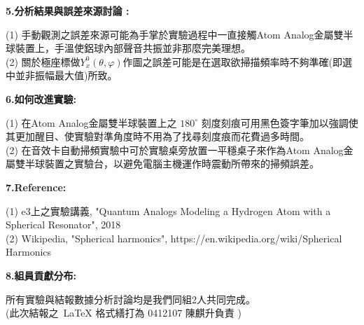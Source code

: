 \documentclass[UTF8]{ctexart}
\begin{document}
\begin{CJK*}{UTF8}{song}


\begin{large}
\textbf{5.分析結果與誤差來源討論 :} \\
\end{large}
(1) 手動觀測之誤差來源可能為手掌於實驗過程中一直接觸Atom Analog金屬雙半球裝置上，手溫使鋁球內部聲音共振並非那麼完美理想。 \\
(2) 關於極座標做$Y^{0}_{x}(\theta,\varphi)$作圖之誤差可能是在選取欲掃描頻率時不夠準確(即選中並非振幅最大值)所致。\\

\begin{large}
\textbf{6.如何改進實驗: } \\
\end{large}
(1) 在Atom Analog金屬雙半球裝置上之 $180^{\circ}$ 刻度刻痕可用黑色簽字筆加以強調使其更加醒目、使實驗對準角度時不用為了找尋刻度痕而花費過多時間。  \\
(2) 在音效卡自動掃頻實驗中可於實驗桌旁放置一平穩桌子來作為Atom Analog金屬雙半球裝置之實驗台，以避免電腦主機運作時震動所帶來的掃頻誤差。  \\

\begin{large}
\textbf{7.Reference: } \\
\end{large}
(1) e3上之實驗講義, "Quantum Analogs Modeling a Hydrogen Atom with a Spherical Resonator", 2018 \\
(2) Wikipedia, "Spherical harmonics",  https://en.wikipedia.org/wiki/Spherical Harmonics \\


\begin{large}
\textbf{8.組員貢獻分布: } \\
\end{large}
所有實驗與結報數據分析討論均是我們同組2人共同完成。 \\
(此次結報之~\LaTeX{} 格式繕打為 0412107 陳麒升負責 )


\end{CJK*}
\end{document}
